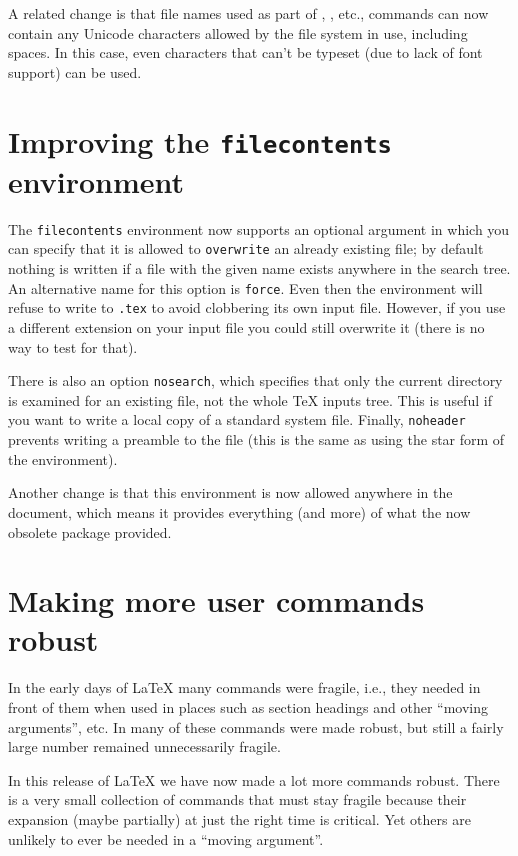 \documentclass{ltnews}
\providecommand\option[1]{\texttt{#1}}
\providecommand\env[1]{\texttt{#1}}
\providecommand\env[1]{\texttt{#1}}
\begin{document}
A related change is that file names used as part of ,
, etc., commands
can now contain any
Unicode characters allowed by the file system in use,
including spaces.
In this case,
 even characters that can't be typeset
(due to lack of font support) can be used.


\section{Improving the \env{filecontents} environment}

The \env{filecontents} environment now supports an optional argument
in which you can specify that it is allowed to \option{overwrite} an
already existing file;
 by default nothing is written if a file with the given name
exists anywhere in the search tree. An alternative name for this
option is \texttt{force}.
Even then the environment will refuse to write
to \texttt{.tex} to avoid clobbering its own input
file. However, if you use a different extension on your input file you
could still overwrite it (there is no way to test for that).

There is also an
option
\option{nosearch},
which specifies that only the current directory is
examined for an existing file, not the whole \TeX{} inputs tree.
This is useful if you want to write a
local copy of a standard system file.
Finally, \option{noheader} prevents writing a preamble to the file
(this
is the same as using the star form of the environment).

Another change is that this
environment is
now allowed anywhere in the document,
which means
it provides everything (and more) of what the now obsolete
 package provided.



\section{Making more user commands robust}

In the early days of \LaTeX{} many commands were fragile, i.e., they
needed  in front of them when used in places such as
section headings and other \enquote{moving arguments}, etc.
In \LaTeXe{} many of these commands were made robust,
but still a fairly large number remained unnecessarily fragile.

In this release of \LaTeX{} we have now
made a lot more commands robust.
There is a very small collection of commands that must stay fragile
because their expansion (maybe partially) at just the right time is critical.
Yet others are unlikely to ever be needed in a \enquote{moving argument}.
\end{document}
